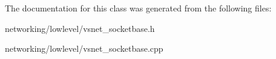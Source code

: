 The documentation for this class was generated from the following files\+:\begin{DoxyCompactItemize}
\item 
networking/lowlevel/vsnet\+\_\+socketbase.\+h\item 
networking/lowlevel/vsnet\+\_\+socketbase.\+cpp\end{DoxyCompactItemize}
